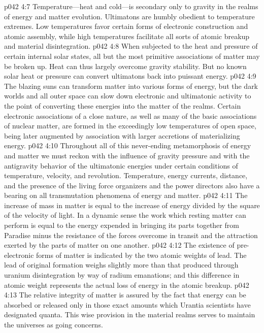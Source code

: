 \vs p042 4:7 Temperature---heat and cold---is secondary only to gravity in the realms of energy and matter evolution. Ultimatons are humbly obedient to temperature extremes. Low temperatures favor certain forms of electronic construction and atomic assembly, while high temperatures facilitate all sorts of atomic breakup and material disintegration.
\vs p042 4:8 When subjected to the heat and pressure of certain internal solar states, all but the most primitive associations of matter may be broken up. Heat can thus largely overcome gravity stability. But no known solar heat or pressure can convert ultimatons back into puissant energy.
\vs p042 4:9 The blazing suns can transform matter into various forms of energy, but the dark worlds and all outer space can slow down electronic and ultimatonic activity to the point of converting these energies into the matter of the realms. Certain electronic associations of a close nature, as well as many of the basic associations of nuclear matter, are formed in the exceedingly low temperatures of open space, being later augmented by association with larger accretions of materializing energy.\plusone
\vs p042 4:10 Throughout all of this never\hyp{}ending metamorphosis of energy and matter we must reckon with the influence of gravity pressure and with the antigravity behavior of the ultimatonic energies under certain conditions of temperature, velocity, and revolution. Temperature, energy currents, distance, and the presence of the living force organizers and the power directors also have a bearing on all transmutation phenomena of energy and matter.
\vs p042 4:11 The increase of mass in matter is equal to the increase of energy divided by the square of the velocity of light. In a dynamic sense the work which resting matter can perform is equal to the energy expended in bringing its parts together from Paradise minus the resistance of the forces overcome in transit and the attraction exerted by the parts of matter on one another.
\pc \vs p042 4:12 The existence of pre\hyp{}electronic forms of matter is indicated by the two atomic weights of lead. The lead of original formation weighs slightly more than that produced through uranium disintegration by way of radium emanations; and this difference in atomic weight represents the actual loss of energy in the atomic breakup.
\pc \vs p042 4:13 The relative integrity of matter is assured by the fact that energy can be absorbed or released only in those exact amounts which Urantia scientists have designated quanta. This wise provision in the material realms serves to maintain the universes as going concerns.
